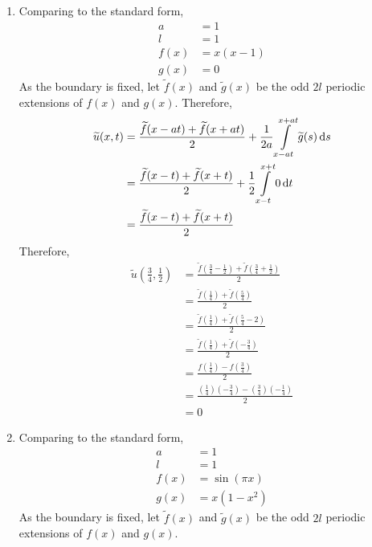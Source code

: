 \documentclass[fleqn, a4paper, 11pt, oneside]{amsart}
\theoremstyle{definition}
\theoremstyle{theorem}
\renewcommand{\tilde}{\widetilde}
\begin{document}
\begin{solution}
	\begin{enumerate}[leftmargin=*]
		\item
			Comparing to the standard form,
			\begin{align*}
				a &= 1\\
				l &= 1\\
				f(x) &= x (x - 1)\\
				g(x) &= 0
			\end{align*}
			As the boundary is fixed, let $\tilde{f}(x)$ and $\tilde{g}(x)$ be the odd $2 l$ periodic extensions of $f(x)$ and $g(x)$.
			Therefore,
			\begin{align*}
				\tilde{u}(x,t) &= \frac{\tilde{f}(x - a t) + \tilde{f}(x + a t)}{2} + \frac{1}{2 a} \int\limits_{x - a t}^{x + a t} \tilde{g}(s) \dif s\\
				&= \frac{\tilde{f}(x - t) + \tilde{f}(x + t)}{2} + \frac{1}{2} \int\limits_{x - t}^{x + t} 0 \dif t\\
				&= \frac{\tilde{f}(x - t) + \tilde{f}(x + t)}{2}
			\end{align*}
			Therefore,
			\begin{align*}
				\tilde{u}\left( \frac{3}{4},\frac{1}{2} \right) &= \frac{\tilde{f}\left( \frac{3}{4} - \frac{1}{2} \right) + \tilde{f}\left( \frac{3}{4} + \frac{1}{2} \right)}{2}\\
				&= \frac{\tilde{f}\left( \frac{1}{4} \right) + \tilde{f}\left( \frac{5}{4} \right)}{2}\\
				&= \frac{\tilde{f}\left( \frac{1}{4} \right) + \tilde{f}\left( \frac{5}{4} - 2 \right)}{2}\\
				&= \frac{\tilde{f}\left( \frac{1}{4} \right) + \tilde{f}\left( -\frac{3}{4} \right)}{2}\\
				&= \frac{f\left( \frac{1}{4} \right) - f\left( \frac{3}{4} \right)}{2}\\
				&= \frac{\left( \frac{1}{4} \right) \left( -\frac{3}{4} \right) - \left( \frac{3}{4} \right) \left( -\frac{1}{4} \right)}{2}\\
				&= 0
			\end{align*}
		\item
			Comparing to the standard form,
			\begin{align*}
				a &= 1\\
				l &= 1\\
				f(x) &= \sin(\pi x)\\
				g(x) &= x \left( 1 - x^2 \right)
			\end{align*}
			As the boundary is fixed, let $\tilde{f}(x)$ and $\tilde{g}(x)$ be the odd $2 l$ periodic extensions of $f(x)$ and $g(x)$.

\end{enumerate}
\end{solution}
\end{document}
